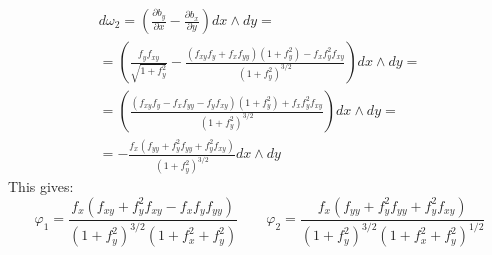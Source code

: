 \documentclass{article}
\begin{document}
\begin{equation}
\begin{gathered}
    d\omega_2 = \left(\frac{\partial b_y}{\partial x} - \frac{\partial b_x}{\partial y}\right) dx \wedge dy = \\ =
    \left(
        \frac{f_yf_{xy}}{\sqrt{1 + f_y^2}} -
        \frac{(f_{xy}f_y + f_xf_{yy})(1 + f_y^2) - f_xf_y^2f_{xy}}{(1 + f_y^2)^{3/2}}
    \right) dx \wedge dy = \\ =
    \left(
        \frac{(f_{xy}f_y - f_xf_{yy} - f_yf_{xy})(1 + f_y^2) + f_xf_y^2f_{xy}}{(1 + f_y^2)^{3/2}}
    \right) dx \wedge dy = \\ =
    -\frac{f_x(f_{yy} + f_y^2f_{yy} + f_y^2f_{xy})}{(1 + f_y^2)^{3/2}}
    dx \wedge dy
\end{gathered}
\end{equation}
This gives:
\begin{equation}
    \varphi_1 = \frac{f_x(f_{xy} + f_y^2f_{xy} - f_xf_yf_{yy})}{\left(1 + f_y^2\right)^{3/2}\left(1 + f_x^2 + f_y^2\right)}
    \qquad
    \varphi_2 = \frac{f_x(f_{yy} + f_y^2f_{yy} + f_y^2f_{xy})}{(1 + f_y^2)^{3/2}\left(1 + f_x^2 + f_y^2\right)^{1/2}}
\end{equation}
\end{document}
